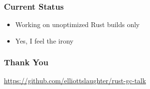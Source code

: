 \documentclass[ignorenonframetext,12pt]{beamer}
\begin{document}
\begin{frame}\frametitle{Current Status}
\begin{itemize}
  \item Working on unoptimized Rust builds only
  \item Yes, I feel the irony
\end{itemize}
\end{frame}

\begin{frame}\frametitle{Thank You}
\url{https://github.com/elliottslaughter/rust-gc-talk}
\end{frame}
\end{document}
